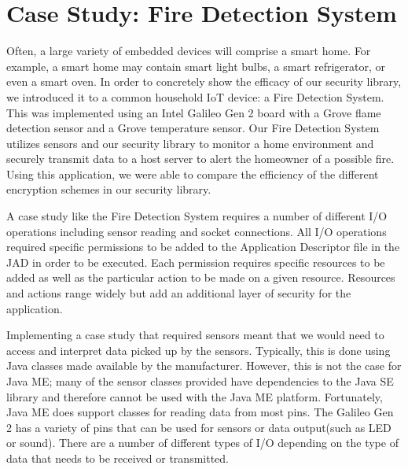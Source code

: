 \section{Case Study: Fire Detection System}

Often, a large variety of embedded devices will comprise a smart home. For example, a smart home may contain smart light bulbs, a smart refrigerator, or even a smart oven. In order to concretely show the efficacy of our security library, we introduced it to a common household IoT device: a Fire Detection System. This was implemented using an Intel Galileo Gen 2 board with a Grove flame detection sensor and a Grove temperature sensor. Our Fire Detection System utilizes  sensors  and our security library to monitor a home environment and securely transmit data to a host server to alert the homeowner of a possible fire. Using this application, we were able to compare the efficiency of the different encryption schemes in our security library.

A case study like the Fire Detection System requires a number of different I/O operations including sensor reading and socket connections. All I/O operations required specific permissions to be added to the Application Descriptor file in the JAD in order to be executed. Each permission requires specific resources to be added as well as the particular action to be made on a given resource. Resources and actions range widely but add an additional layer of security for the application.

Implementing a case study that required sensors meant that we would need to access and interpret data picked up by the sensors. Typically, this is done using Java classes made available by the manufacturer. However, this is not the case for Java ME; many of the sensor classes provided have dependencies to  the Java SE library and therefore cannot be used with the Java ME platform. Fortunately, Java ME does support classes for reading data from most pins. The Galileo Gen 2 has a variety of pins that can be used for sensors or data output(such as LED or sound). There are a number of different types of I/O depending on the type of data that needs to be received or transmitted.

